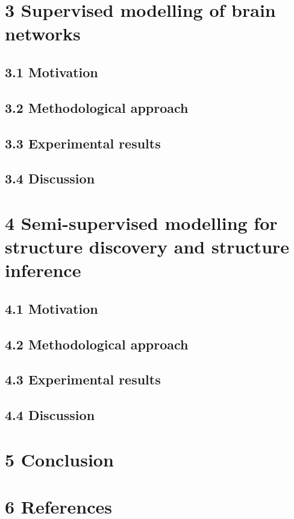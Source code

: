 \documentclass[authoryear,review,3p]{elsarticle}
\begin{document}
\bigskip
\section*{3 Supervised modelling of brain networks}

\subsection*{3.1 Motivation}
\subsection*{3.2 Methodological approach}
\subsection*{3.3 Experimental results}
\subsection*{3.4 Discussion}

\bigskip
\section*{4 Semi-supervised modelling for structure discovery
and structure inference}

\subsection*{4.1 Motivation}
\subsection*{4.2 Methodological approach}
\subsection*{4.3 Experimental results}
\subsection*{4.4 Discussion}


\bigskip
\section*{5 Conclusion}



\bigskip
\section*{6 References}



\end{document}
